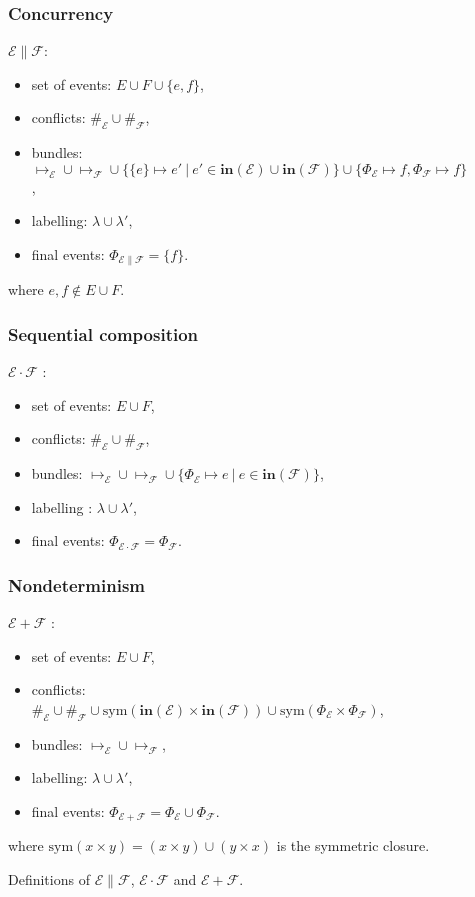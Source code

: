 \documentclass{llncs}
\newcommand{\EE}{\mathcal{E}}
\newcommand{\FF}{\mathcal{F}}
\newcommand{\init}{\mathbf{in}}
\newcommand{\<}{\langle}
\renewcommand{\>}{\rangle}
\newcommand{\exit}{\Phi}
\begin{document}
\begin{figure}[!ht]
\hspace{-2.5mm}\begin{minipage}{.5\linewidth}
\subsubsection{Concurrency} $\EE\|\FF$:\\

\begin{itemize}
\item set of events: $E\cup F\cup\{e,f\}$,
\item conflicts: $\#_{\EE}\cup\#_\FF$,
\item bundles: $\mapsto_\EE\cup\mapsto_\FF\cup\{\{e\}\mapsto e'\ |\ e'\in\init(\EE)\cup\init(\FF)\}\cup\{\exit_\EE\mapsto f,\exit_\FF\mapsto f\}$,
\item labelling: $\lambda\cup\lambda'$,
\item final events: $\exit_{\EE\|\FF} = \{f\}$.
 \end{itemize} 
 where $e,f\notin E\cup F$.
\end{minipage}\hspace{5mm}
\begin{minipage}{.5\linewidth}
\subsubsection{Sequential composition} $\EE\cdot\FF$ :\\

\begin{itemize}
\item set of events: $E\cup F$,
\item conflicts: $\#_{\EE}\cup\#_\FF$,
\item bundles: $\mapsto_\EE\cup\mapsto_\FF\cup\{\exit_\EE\mapsto e\ |\ e\in\init(\FF)\}$,
\item labelling : $\lambda\cup\lambda'$,
\item final events: $\exit_{\EE\cdot\FF} = \exit_{\FF}$.
\end{itemize}
\end{minipage}

\subsubsection{Nondeterminism} $\EE+\FF$ :
\begin{itemize}
\item set of events: $E\cup F$,
\item conflicts: $\#_{\EE}\cup\#_\FF\cup\mathrm{sym}(\init(\EE)\times\init(\FF))\cup\mathrm{sym}(\exit_\EE\times\exit_\FF)$,
\item bundles: $\mapsto_\EE\cup\mapsto_\FF$,
\item labelling: $\lambda\cup\lambda'$,
\item final events: $\exit_{\EE+\FF} = \exit_\EE\cup\exit_\FF$.
\end{itemize}
where $\mathrm{sym}(x\times y) = (x\times y)\cup (y\times x)$ is the symmetric closure.
\caption{Definitions of $\EE\|\FF$, $\EE\cdot\FF$ and $\EE+\FF$.}\label{fig:operators}
\end{figure}
\end{document}
